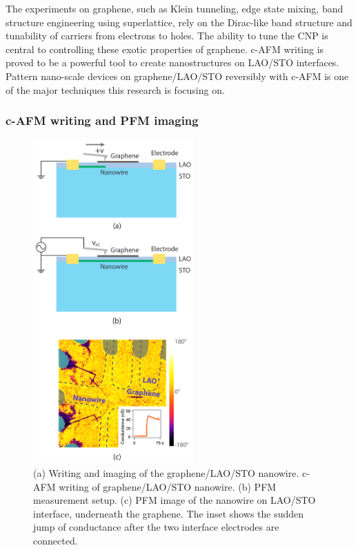 \documentclass[pdflatex, sectionletters, 12pt, final, phd]{pittetd}    %
\begin{document}
The experiments on graphene, such as Klein tunneling\cite{allain2011klein, katsnelson2006chiral, young2009quantum, shytov2008klein}, edge state mixing\cite{williams2007quantum, abanin2007quantized, lohmann2009four, amet2014selective}, band structure engineering using superlattice\cite{forsythe2018band}, rely on the Dirac-like band structure and tunability of carriers from electrons to holes. The ability to tune the CNP is central to controlling these exotic properties of graphene. c-AFM writing is proved to be a powerful tool to create nanostructures on LAO/STO interfaces. Pattern nano-scale devices on graphene/LAO/STO reversibly with c-AFM is one of the major techniques this research is focusing on. 

\subsubsection{c-AFM writing and PFM imaging}
\begin{figure}[p]
	\centering
	\includegraphics[width=0.55\textwidth]{Drawing/GraphenePFM.pdf}
	\caption[Writing and imaging of the graphene/LAO/STO nanowire]{(a) Writing and imaging of the graphene/LAO/STO nanowire. c-AFM writing of graphene/LAO/STO nanowire. (b) PFM measurement setup. (c) PFM image of the nanowire on LAO/STO interface, underneath the graphene. The inset shows the sudden jump of conductance after the two interface electrodes are connected.}
	\label{FIG:GraphenePFM}
\end{figure}
\end{document}
